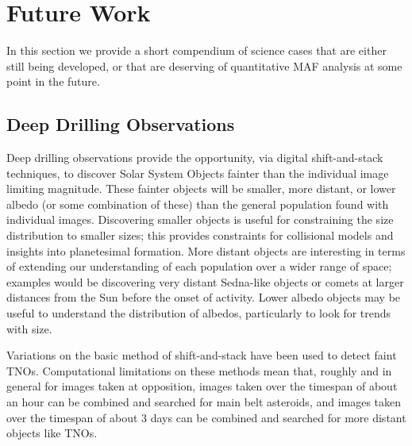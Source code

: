 %
%

\section{Future Work}
\def\secname{\chpname:future}\label{sec:\secname}

In this section we provide a short compendium of science cases that
are either still being developed, or that are deserving of quantitative
MAF analysis at some point in the future.

%
\subsection{Deep Drilling Observations}
\def\secname{\chpname:dd}\label{sec:\secname}


Deep drilling observations provide the opportunity, via digital
shift-and-stack techniques, to discover Solar System Objects fainter
than the individual image limiting magnitude. These fainter objects
will be smaller, more distant, or lower albedo (or some combination of these)
than the general population found with individual images. Discovering smaller
objects is useful for constraining the size distribution to smaller
sizes; this provides constraints for collisional models and insights
into planetesimal formation. More distant objects are interesting in
terms of extending our understanding of each population over a wider
range of space; examples would be discovering very distant
Sedna-like objects or comets at larger distances from the Sun before
the onset of activity. Lower albedo objects may be useful to
understand the distribution of albedos, particularly to look for
trends with size.

Variations on the basic method of shift-and-stack have been used to
detect faint TNOs.
Computational limitations on these methods mean that, roughly and in
general for images taken at opposition, images taken over the timespan
of about an hour can be combined and searched for main belt asteroids,
and images taken over the timespan of about 3 days can be combined and
searched for more distant objects like TNOs.

